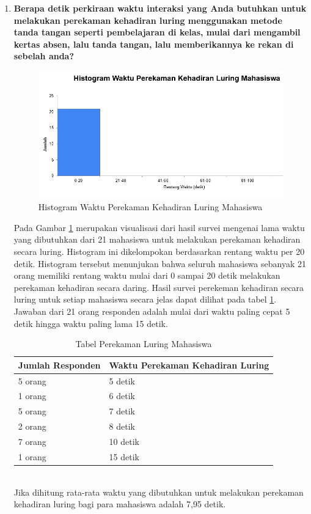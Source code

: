 \begin{enumerate}
	\item \textbf{Berapa detik perkiraan waktu interaksi yang Anda butuhkan untuk melakukan perekaman kehadiran luring menggunakan metode tanda tangan seperti pembelajaran di kelas, mulai dari mengambil kertas absen, lalu tanda tangan, lalu memberikannya ke rekan di sebelah anda?}
	\begin{figure}[H]
		\centering
		\includegraphics[scale=0.7]{Gambar/LuringMahasiswa.jpg}
		\caption{Histogram Waktu Perekaman Kehadiran Luring Mahasiswa} 
		\label{fig:LuringMahasiswa}
	\end{figure}
	Pada Gambar \ref{fig:LuringMahasiswa} merupakan visualisasi dari hasil survei mengenai lama waktu yang dibutuhkan dari 21 mahasiswa untuk melakukan perekaman kehadiran secara luring. Histogram ini dikelompokan berdasarkan rentang waktu per 20 detik. Histogram tersebut menunjukan bahwa seluruh mahasiswa sebanyak 21 orang memiliki rentang waktu mulai dari 0 sampai 20 detik melakukan perekaman kehadiran secara daring. Hasil survei perekeman kehadiran secara luring untuk setiap mahasiswa secara jelas dapat dilihat pada tabel \ref{tab:luringMahasiswa}. Jawaban dari 21 orang responden adalah mulai dari waktu paling cepat 5 detik hingga waktu paling lama 15 detik.
	\begin{table}[ht]			
		\caption{Tabel Perekaman Luring Mahasiswa}
		\centering
		\begin{tabular}{|p{4cm} |p{7cm}|}\hline
			Jumlah Responden &  Waktu Perekaman Kehadiran Luring \\ \hline     
			5 orang &  5 detik\\ \hline 
			1 orang &  6 detik\\ \hline 
			5 orang &  7 detik\\ \hline 
			2 orang &  8 detik\\ \hline 
			7 orang &  10 detik\\ \hline 
			1 orang &  15 detik\\ \hline
		\end{tabular}
		\label{tab:luringMahasiswa}
	\end{table}\\
	Jika dihitung rata-rata waktu yang dibutuhkan untuk melakukan perekaman kehadiran luring bagi para mahasiswa adalah 7,95 detik.
\end{enumerate}
